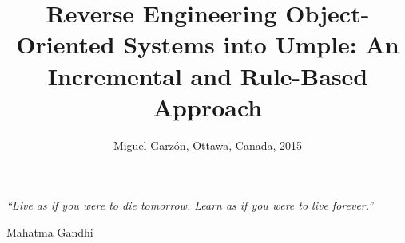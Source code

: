\documentclass[a4paper, 11pt, oneside]{Thesis}  %
\begin{document}
\frontmatter      %

\title  {Reverse Engineering Object-Oriented Systems into Umple: An Incremental and Rule-Based Approach}
\date  {\textcopyright  Miguel Garz\'{o}n, Ottawa, Canada, 2015}

\maketitle


\fancyhead{}  %

\rhead{\thepage}  %
\lhead{}  %

\pagestyle{fancy}  %

\pagestyle{empty}  %
\null\vfill
\textit{``Live as if you were to die tomorrow. Learn as if you were to live forever.''}

\begin{flushright}
Mahatma Gandhi   
\end{flushright}

\vfill\vfill\vfill\vfill\vfill\vfill\null
\clearpage  %
\end{document}
